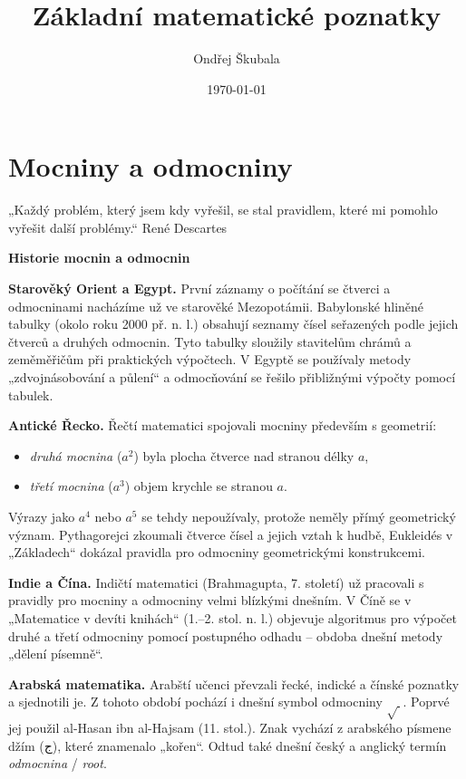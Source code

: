 \documentclass[12pt,a4paper]{article}
\title{Základní matematické poznatky}
\author{Ondřej Škubala}
\date{\today}
\begin{document}
\maketitle
\newpage

\section{Mocniny a odmocniny}

\begin{quotebox}
{„Každý problém, který jsem kdy vyřešil, se stal pravidlem, které mi pomohlo vyřešit další problémy.“}
{René Descartes}
\end{quotebox}

\begin{historicalbox}
\textbf{Historie mocnin a odmocnin}  

\smallskip
\textbf{Starověký Orient a Egypt.}  
První záznamy o počítání se čtverci a odmocninami nacházíme už ve starověké Mezopotámii. Babylonské hliněné tabulky (okolo roku 2000 př. n. l.) obsahují seznamy čísel seřazených podle jejich čtverců a druhých odmocnin. Tyto tabulky sloužily stavitelům chrámů a zeměměřičům při praktických výpočtech. V Egyptě se používaly metody „zdvojnásobování a půlení“ a odmocňování se řešilo přibližnými výpočty pomocí tabulek.

\smallskip
\textbf{Antické Řecko.}  
Řečtí matematici spojovali mocniny především s geometrií:
\begin{itemize}
    \item \emph{druhá mocnina} (\(a^2\)) byla plocha čtverce nad stranou délky \(a\),
    \item \emph{třetí mocnina} (\(a^3\)) objem krychle se stranou \(a\).
\end{itemize}
Výrazy jako \(a^4\) nebo \(a^5\) se tehdy nepoužívaly, protože neměly přímý geometrický význam.  
Pythagorejci zkoumali čtverce čísel a jejich vztah k hudbě, 
Eukleidés v „Základech“ dokázal pravidla pro odmocniny geometrickými konstrukcemi.

\smallskip
\textbf{Indie a Čína.}  
Indičtí matematici (Brahmagupta, 7. století) už pracovali s pravidly pro mocniny a 
odmocniny velmi blízkými dnešním. V Číně se v „Matematice v devíti knihách“ (1.–2. stol. n. l.) 
objevuje algoritmus pro výpočet druhé a třetí odmocniny pomocí postupného 
odhadu – obdoba dnešní metody „dělení písemně“.

\smallskip
\textbf{Arabská matematika.}  
Arabští učenci převzali řecké, indické a čínské poznatky a sjednotili je. 
Z tohoto období pochází i dnešní symbol odmocniny \(\sqrt{\ }\). 
Poprvé jej použil al-Hasan ibn al-Hajsam (11. stol.). 
Znak vychází z arabského písmene džím (ج), které znamenalo „kořen“.
Odtud také dnešní český a anglický termín \emph{odmocnina} / \emph{root}.


\end{historicalbox}
\end{document}
